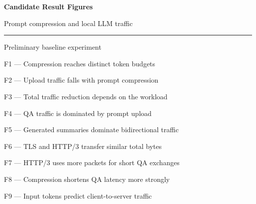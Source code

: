 \documentclass[aspectratio=169,10pt]{beamer}
\begin{document}
\begin{frame}
\vfill
{\Huge\bfseries Candidate Result Figures\par}
\vspace{0.3cm}
{\Large Prompt compression and local LLM traffic\par}
\vspace{0.45cm}
{\color{AIBlue}\rule{0.88\linewidth}{1.2pt}\par}
\vspace{0.45cm}
{\small Preliminary baseline experiment}
\vfill
\end{frame}

\begin{frame}{F1 --- Compression reaches distinct token budgets}
\centering
\PlotTokenMedians
\end{frame}

\begin{frame}{F2 --- Upload traffic falls with prompt compression}
\centering
\PlotUploadReduction
\end{frame}

\begin{frame}{F3 --- Total traffic reduction depends on the workload}
\centering
\PlotTotalReduction
\end{frame}

\begin{frame}{F4 --- QA traffic is dominated by prompt upload}
\centering
\PlotDirectionQA
\end{frame}

\begin{frame}{F5 --- Generated summaries dominate bidirectional traffic}
\centering
\PlotDirectionSummary
\end{frame}

\begin{frame}{F6 --- TLS and HTTP/3 transfer similar total bytes}
\centering
\PlotProtocolBytes
\end{frame}

\begin{frame}{F7 --- HTTP/3 uses more packets for short QA exchanges}
\centering
\PlotProtocolPackets
\end{frame}

\begin{frame}{F8 --- Compression shortens QA latency more strongly}
\centering
\PlotLatencyMedians
\end{frame}

\begin{frame}{F9 --- Input tokens predict client-to-server traffic}
\centering
\PlotTokenUploadScatter
\end{frame}
\end{document}
